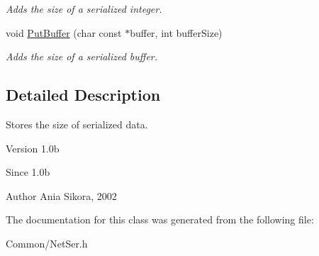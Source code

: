 \begin{DoxyCompactItemize}
\begin{DoxyCompactList}\small\item\em Adds the size of a serialized integer. \end{DoxyCompactList}\item 
\hypertarget{class_common_1_1_counting_serializer_a046147c02bb054da95faf8e287aa83de}{void \hyperlink{class_common_1_1_counting_serializer_a046147c02bb054da95faf8e287aa83de}{Put\-Buffer} (char const $\ast$buffer, int buffer\-Size)}\label{class_common_1_1_counting_serializer_a046147c02bb054da95faf8e287aa83de}

\begin{DoxyCompactList}\small\item\em Adds the size of a serialized buffer. \end{DoxyCompactList}\end{DoxyCompactItemize}


\subsection{Detailed Description}
Stores the size of serialized data. 

\begin{DoxyVersion}{Version}
1.\-0b 
\end{DoxyVersion}
\begin{DoxySince}{Since}
1.\-0b 
\end{DoxySince}
\begin{DoxyAuthor}{Author}
Ania Sikora, 2002 
\end{DoxyAuthor}


The documentation for this class was generated from the following file\-:\begin{DoxyCompactItemize}
\item 
Common/Net\-Ser.\-h\end{DoxyCompactItemize}
